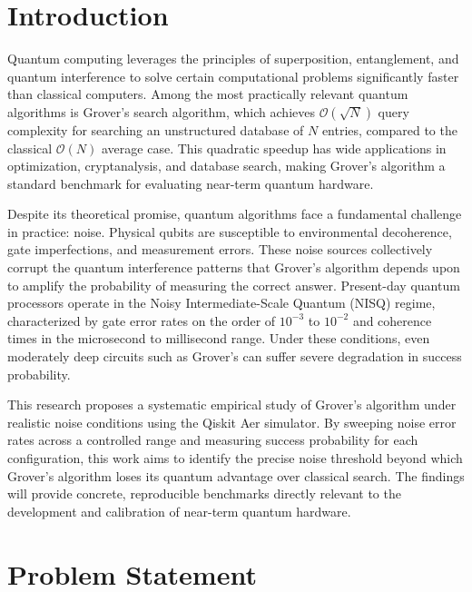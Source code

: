 \documentclass[12pt, a4paper]{article}
\begin{document}
\section{Introduction}

Quantum computing leverages the principles of superposition, entanglement, and
quantum interference to solve certain computational problems significantly faster
than classical computers. Among the most practically relevant quantum algorithms is
Grover's search algorithm, which achieves $\mathcal{O}(\sqrt{N})$ query complexity
for searching an unstructured database of $N$ entries, compared to the classical
$\mathcal{O}(N)$ average case. This quadratic speedup has wide applications in
optimization, cryptanalysis, and database search, making Grover's algorithm a
standard benchmark for evaluating near-term quantum hardware.

Despite its theoretical promise, quantum algorithms face a fundamental challenge in
practice: noise. Physical qubits are susceptible to environmental decoherence, gate
imperfections, and measurement errors. These noise sources collectively corrupt the
quantum interference patterns that Grover's algorithm depends upon to amplify the
probability of measuring the correct answer. Present-day quantum processors operate
in the Noisy Intermediate-Scale Quantum (NISQ) regime, characterized by gate error
rates on the order of $10^{-3}$ to $10^{-2}$ and coherence times in the microsecond
to millisecond range. Under these conditions, even moderately deep circuits such as
Grover's can suffer severe degradation in success probability.

This research proposes a systematic empirical study of Grover's algorithm under
realistic noise conditions using the Qiskit Aer simulator. By sweeping noise error
rates across a controlled range and measuring success probability for each
configuration, this work aims to identify the precise noise threshold beyond which
Grover's algorithm loses its quantum advantage over classical search. The findings
will provide concrete, reproducible benchmarks directly relevant to the development
and calibration of near-term quantum hardware.

\section{Problem Statement}
\end{document}
